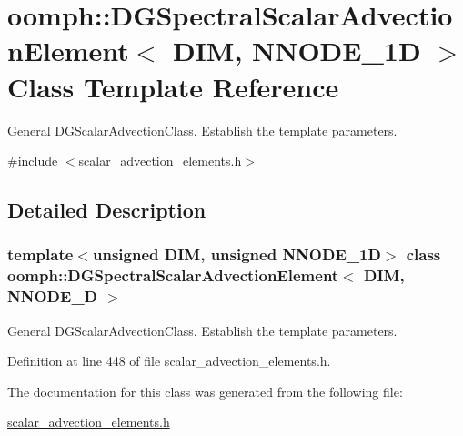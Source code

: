 \hypertarget{classoomph_1_1DGSpectralScalarAdvectionElement}{}\section{oomph\+:\+:D\+G\+Spectral\+Scalar\+Advection\+Element$<$ D\+IM, N\+N\+O\+D\+E\+\_\+1D $>$ Class Template Reference}
\label{classoomph_1_1DGSpectralScalarAdvectionElement}


General D\+G\+Scalar\+Advection\+Class. Establish the template parameters.  




{\ttfamily \#include $<$scalar\+\_\+advection\+\_\+elements.\+h$>$}



\subsection{Detailed Description}
\subsubsection*{template$<$unsigned D\+IM, unsigned N\+N\+O\+D\+E\+\_\+1D$>$\newline
class oomph\+::\+D\+G\+Spectral\+Scalar\+Advection\+Element$<$ D\+I\+M, N\+N\+O\+D\+E\+\_\+D $>$}

General D\+G\+Scalar\+Advection\+Class. Establish the template parameters. 

Definition at line 448 of file scalar\+\_\+advection\+\_\+elements.\+h.



The documentation for this class was generated from the following file\+:\begin{DoxyCompactItemize}
\item 
\hyperlink{scalar__advection__elements_8h}{scalar\+\_\+advection\+\_\+elements.\+h}\end{DoxyCompactItemize}
